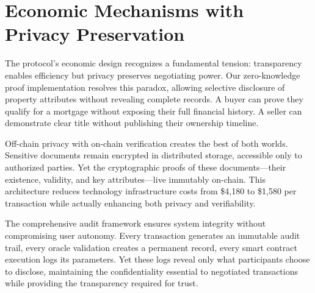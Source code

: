 \section{Economic Mechanisms with Privacy Preservation}

The protocol's economic design recognizes a fundamental tension: transparency enables efficiency but privacy preserves negotiating power. Our zero-knowledge proof implementation resolves this paradox, allowing selective disclosure of property attributes without revealing complete records. A buyer can prove they qualify for a mortgage without exposing their full financial history. A seller can demonstrate clear title without publishing their ownership timeline.

Off-chain privacy with on-chain verification creates the best of both worlds. Sensitive documents remain encrypted in distributed storage, accessible only to authorized parties. Yet the cryptographic proofs of these documents—their existence, validity, and key attributes—live immutably on-chain. This architecture reduces technology infrastructure costs from \$4{,}180 to \$1{,}580 per transaction while actually enhancing both privacy and verifiability.

The comprehensive audit framework ensures system integrity without compromising user autonomy. Every transaction generates an immutable audit trail, every oracle validation creates a permanent record, every smart contract execution logs its parameters. Yet these logs reveal only what participants choose to disclose, maintaining the confidentiality essential to negotiated transactions while providing the transparency required for trust.

